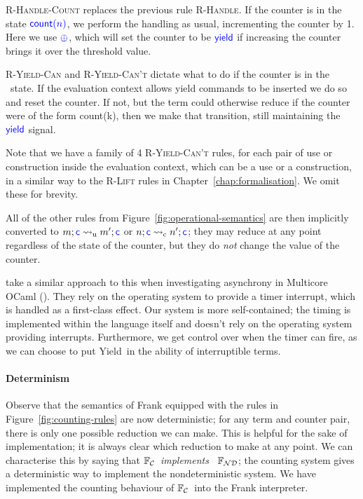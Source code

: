 \documentclass[msc,deptreport,cs]{infthesis} %
\newcommand\nondetfrank{$\mathbb{F}_{\cal{ND}}$}
\newcommand\countingfrank{$\mathbb{F}_{\cal{C}}$}
\newcommand{\counter}{{\color{blue} \textsf{c}}}
\newcommand{\justc}[1]{{\color{blue} \textsf{count}({#1})}}
\newcommand{\yieldc}{{\color{blue}{\textsf{yield}}}}
\newcommand{\plusc}{{\color{blue} \oplus}}
\newcommand\yield{\textsf{yield}\xspace}
\newcommand\Yield{\textsf{Yield}\xspace}
\newcommand{\redtou}{\leadsto_{\mathrm{u}}}
\newcommand{\redtoc}{\leadsto_{\mathrm{c}}}
\begin{document}
\textsc{R-Handle-Count} replaces the previous rule \textsc{R-Handle}. If the
counter is in the state $\justc{n}$, we perform the handling as usual,
incrementing the counter by 1. Here we use $\plusc$, which will set the counter
to be $\yieldc$ if increasing the counter brings it over the threshold value.

\textsc{R-Yield-Can} and \textsc{R-Yield-Can't} dictate what to do if the
counter is in the \yieldc~state. If the evaluation context allows \yield{}
commands to be inserted we do so and reset the counter. If not, but the term
could otherwise reduce if the counter were of the form \justc{k}, then we make
that transition, still maintaining the $\yieldc$ signal.

Note that we have a family of 4 \textsc{R-Yield-Can't} rules, for each pair of
use or construction inside the evaluation context, which can be a use or a
construction, in a similar way to the \textsc{R-Lift} rules in
Chapter~\ref{chap:formalisation}. We omit these for brevity.

All of the other rules from Figure~\ref{fig:operational-semantics} are then
implicitly converted to $m; \counter \redtou m'; \counter$ or
$n; \counter \redtoc n'; \counter$; they may reduce at any point
regardless of the state of the counter, but they do \emph{not} change the value
of the counter.

\citeauthor{dolan2017concurrent} take a similar approach to this when
investigating asynchrony in Multicore OCaml (\cite{dolan2017concurrent}). They
rely on the operating system to provide a timer interrupt, which is handled as a
first-class effect. Our system is more self-contained; the timing is implemented
within the language itself and doesn't rely on the operating system providing
interrupts. Furthermore, we get control over when the timer can fire, as we can
choose to put \Yield~in the ability of interruptible terms.

\paragraph*{Determinism}
Observe that the semantics of Frank equipped with the rules in
Figure~\ref{fig:counting-rules} are now deterministic; for any term and counter
pair, there is only one possible reduction we can make. This is helpful for the
sake of implementation; it is always clear which reduction to make at any point.
We can characterise this by saying that \countingfrank~\emph{implements}~
\nondetfrank; the counting system gives a deterministic way to implement the
nondeterministic system. We have implemented the counting behaviour of
\countingfrank~into the Frank interpreter.
\end{document}
